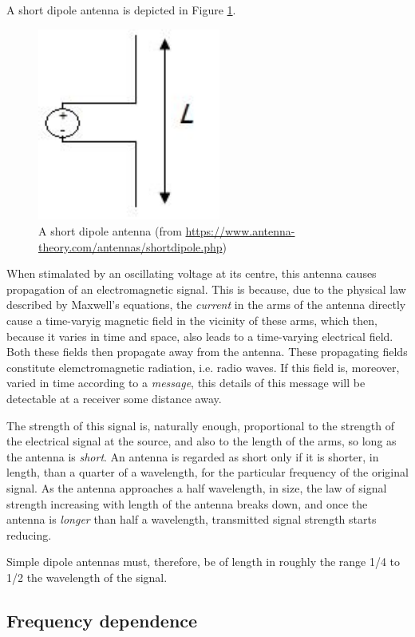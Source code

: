 A short dipole antenna is depicted in Figure \ref{dipole}.
\begin{figure}
	\centering
	\includegraphics[width=6cm]{dipole}
	\caption{A short dipole antenna (from \url{https://www.antenna-theory.com/antennas/shortdipole.php})}
	\label{dipole}
\end{figure}
When stimalated by an oscillating voltage at its centre, this antenna causes propagation of an electromagnetic
signal. This is because, due to the physical law described by Maxwell's equations, 
the {\em current} in the arms of the antenna directly cause a time-varyig magnetic field
in the vicinity of these arms, which then, because it varies in time and space, also leads
to a time-varying electrical field. Both these fields then propagate away from the antenna.
These propagating fields constitute elemctromagnetic radiation, i.e. radio waves. If this field
is, moreover, varied in time according to a {\em message}, this details of this message will
be detectable at a receiver some distance away.

The strength of this signal is, naturally enough, proportional to the strength of the electrical signal
at the source, and also to the length of the arms, so long as the antenna is {\em short}.
An antenna is regarded as short only if it is shorter, in length, than a quarter of a wavelength,
for the particular frequency of the original signal. As the antenna approaches a half wavelength, in
size, the law of signal strength increasing with length of the antenna breaks down, and once
the antenna is {\em longer} than half a wavelength, transmitted signal strength starts reducing.

Simple dipole antennas must, therefore, be of length in roughly the range 1/4 to 1/2 the wavelength
of the signal. 


\subsection{Frequency dependence}

